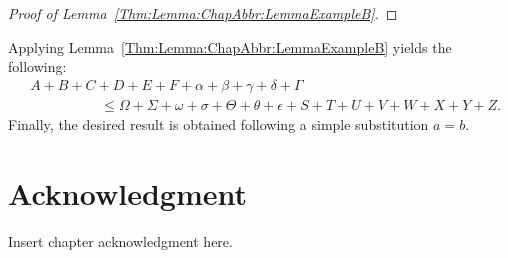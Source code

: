
\begin{proof}
[Proof of Lemma~\ref{Thm:Lemma:ChapAbbr:LemmaExampleB}]
\lipsum[19-20]
\end{proof}


\lipsum[21]
Applying Lemma~\ref{Thm:Lemma:ChapAbbr:LemmaExampleB} yields the following:
\begin{align*}
& A + B + C + D + E + F
+ \alpha + \beta + \gamma + \delta + \Gamma
\\
&\hspace{5em}
\leq
\Omega + \Sigma + \omega + \sigma + \Theta + \theta + \epsilon
+ S + T + U + V + W + X + Y + Z.
\end{align*}
Finally, the desired result is obtained following a simple substitution \mbox{$a=b$}.
\qedmarker


\EnableTOCUpdates


\section{Acknowledgment}
\label{Section:ChapAbbr:Acknowledgment}

Insert chapter acknowledgment here.
\lipsum[22]
